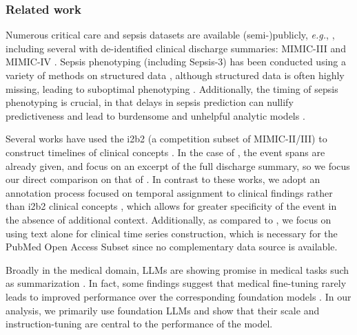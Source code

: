 \begin{sloppypar}
\subsubsection{Related work}
Numerous critical care and sepsis datasets are available \mbox{(semi-)publicly}, \emph{e.g.}, \cite{thoral2021sharing,pollard2018eicu}, including several with de-identified clinical discharge summaries: MIMIC-III \citep{ch06:johnson2016mimic}
and MIMIC-IV \citep{ch06:johnson2023mimic}. 
Sepsis phenotyping (including Sepsis-3) has been conducted using a variety of methods on structured data \citep{johnson2018comparative}, although structured data is often highly missing, leading to suboptimal phenotyping \citep{seinen2025using}.
Additionally, the timing of sepsis phenotyping is crucial, in that delays in sepsis prediction can nullify predictiveness and lead to burdensome and unhelpful analytic models \citep{kamran2024evaluation}.  
\end{sloppypar}

Several works have used the i2b2 (a competition subset of MIMIC-II/III) to construct timelines of clinical concepts \citep{leeuwenberg2020towards,ch06:frattallone2024using}.  
In the case of \cite{leeuwenberg2020towards}, the event spans are already given, and focus on an excerpt of the full discharge summary, so we focus our direct comparison on that of \cite{ch06:frattallone2024using}.
In contrast to these works, we adopt an annotation process focused on temporal assignment to clinical findings rather than i2b2 clinical concepts \citep{ch06:uzuner20112010}, which allows for greater specificity of the event in the absence of additional context.  
Additionally, as compared to \cite{ch06:frattallone2024using},
we focus on using text alone for clinical time series construction, which is necessary for the PubMed Open Access Subset since no complementary data source is available.

Broadly in the medical domain, LLMs are showing promise in medical tasks such as summarization \citep{van2024adapted}.
In fact, some findings suggest that 
medical fine-tuning rarely leads to improved performance over the corresponding foundation models \citep{jeong-etal-2024-medical}. 
In our analysis, we primarily use foundation LLMs and show that their scale and instruction-tuning are central to the performance of the model.  

